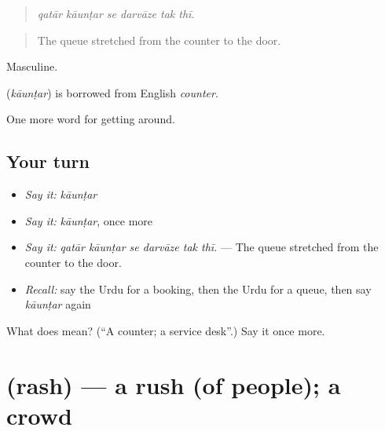 \begin{quote}
     
\end{quote}

\begin{quote}
\emph{qatār kāunṭar se darvāze tak thī.}
\end{quote}

\begin{quote}
The queue stretched from the counter to the door.
\end{quote}

Masculine.

\begin{cousinweb}
\textbf{} (\emph{kāunṭar}) is borrowed from English \emph{counter}.
\end{cousinweb}

\begin{grammarlens}[title={What you've built}]
One more word for getting around.
\end{grammarlens}

\subsection*{Your turn}
\begin{itemize}
\raggedright
  \item \emph{Say it:} \emph{kāunṭar}
  \item \emph{Say it:} \emph{kāunṭar}, once more
  \item \emph{Say it:} \emph{qatār kāunṭar se darvāze tak thī.} — The queue stretched from the counter to the door.
  \item \emph{Recall:} say the Urdu for a booking, then the Urdu for a queue, then say \emph{kāunṭar} again
\end{itemize}

\begin{tcolorbox}[breakable,colback=teal!4,colframe=teal!35!black,title={Before you move on}]
What does  mean? (\textquotedblleft{}A counter; a service desk\textquotedblright{}.) Say it once more.
\end{tcolorbox}
\section[\texorpdfstring{\ur{رش} (rash)}{رش (rash)}]{ (rash) — a rush (of people); a crowd}

\label{lesson:UR-C391-rash}



